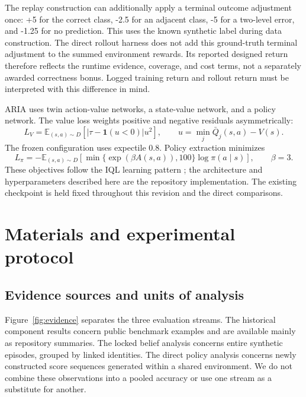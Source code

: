 \documentclass[10pt,a4paper]{article}
\begin{document}
The replay construction can additionally apply a terminal outcome adjustment once: +5 for the correct class, -2.5 for an adjacent class, -5 for a two-level error, and -1.25 for no prediction. This uses the known synthetic label during data construction. The direct rollout harness does not add this ground-truth terminal adjustment to the summed environment rewards. Its reported designed return therefore reflects the runtime evidence, coverage, and cost terms, not a separately awarded correctness bonus. Logged training return and rollout return must be interpreted with this difference in mind.

ARIA uses twin action-value networks, a state-value network, and a policy network. The value loss weights positive and negative residuals asymmetrically:
\begin{equation}
L_V=\mathbb{E}_{(s,a)\sim D}[|\tau-\mathbf{1}(u<0)|u^2],\qquad u=\min_j\bar Q_j(s,a)-V(s).
\end{equation}
The frozen configuration uses expectile 0.8. Policy extraction minimizes
\begin{equation}
L_\pi=-\mathbb{E}_{(s,a)\sim D}[\min\{\exp(\beta A(s,a)),100\}\log\pi(a\mid s)],\qquad\beta=3.
\end{equation}
These objectives follow the IQL learning pattern \cite{iql}; the architecture and hyperparameters described here are the repository implementation. The existing checkpoint is held fixed throughout this revision and the direct comparisons.

\section{Materials and experimental protocol}
\subsection{Evidence sources and units of analysis}
Figure~\ref{fig:evidence} separates the three evaluation streams. The historical component results concern public benchmark examples and are available mainly as repository summaries. The locked belief analysis concerns entire synthetic episodes, grouped by linked identities. The direct policy analysis concerns newly constructed score sequences generated within a shared environment. We do not combine these observations into a pooled accuracy or use one stream as a substitute for another.
\end{document}
